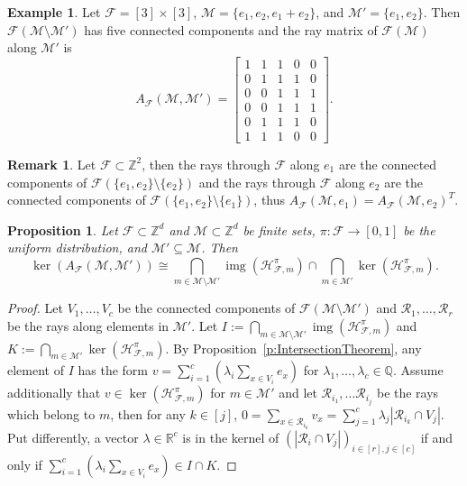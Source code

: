 \documentclass[11pt]{amsart}
\newtheorem{prop}[thm]{Proposition}
\theoremstyle{definition}
\newtheorem{example}[thm]{Example}
\newtheorem{remark}[thm]{Remark}
\numberwithin{equation}{section}
\newcommand{\ring}[1]{\ensuremath{\mathbb{#1}}}
\renewcommand{\>}{\rangle}
\newcommand{\<}{\langle}
\newcommand{\0}{\mathbf{0}}
\newcommand{\1}{\mathbf{1}}
\newcommand{\2}{\mathbf{2}}
\newcommand\QQ{\ring{Q}}
\newcommand\RR{\ring{R}}
\newcommand\ZZ{\ring{Z}}
\newcommand\cF{{\mathcal F}}
\newcommand\cM{{\mathcal M}}
\newcommand\cR{{\mathcal R}}
\DeclareMathOperator\img{img} %
\newcommand{\rayMat}[3]{A_{#1}(#2,#3)}
\newcommand{\heatbathmove}[3]{\mathcal{H}^{#1}_{#2,#3}}
\begin{document}
\begin{example}
Let $\cF =[3]\times [3]$, $\cM=\{e_1, e_2, e_1+e_2 \}$, and $\cM'= \{
e_1, e_2\}$. Then $\cF(\cM\setminus \cM')$ has five connected
components and the ray matrix of $\cF(\cM)$ along
$\cM'$ is 
\[ \rayMat{\cF}{\cM}{\cM'}=
\begin{bmatrix}
1 & 1 & 1 & 0 & 0 \\ 
0 & 1 & 1 & 1 & 0 \\ 
0 & 0 & 1 & 1 & 1 \\
0 & 0 & 1 & 1 & 1\\
0 & 1 & 1 & 1 & 0\\
1 & 1 & 1 & 0 & 0
\end{bmatrix}.
\]
\end{example}

\begin{remark}\label{r:RayMatUnitVecTranspose}
Let $\cF\subset\ZZ^2$, then the rays through $\cF$ along $e_1$ are the
connected components of $\cF(\{e_1,e_2\}\setminus\{e_2\})$ and the rays through $\cF$
along $e_2$ are the connected components of
$\cF(\{e_1,e_2\}\setminus\{e_1\})$, thus
$\rayMat{\cF}{\cM}{e_1}=\rayMat{\cF}{\cM}{e_2}^T$.
\end{remark}

\begin{prop}\label{p:RaysAndCC}
Let $\cF\subset\ZZ^d$ and $\cM\subset\ZZ^d$ be finite sets,
$\pi:\cF\to[0,1]$ be the uniform distribution, and $\cM'\subseteq\cM$.
Then
\begin{equation*}
\ker(\rayMat{\cF}{\cM}{\cM'})\cong
\bigcap_{m\in\cM\setminus\cM'}\img(\heatbathmove{\pi}{\cF}{m})
\cap\bigcap_{m\in\cM'}\ker(\heatbathmove{\pi}{\cF}{m}).
\end{equation*}
\end{prop}
\begin{proof}
Let $V_1,\dots,V_c$ be the connected components of $\cF(\cM\setminus\cM')$ and
$\cR_1,\dots,\cR_r$ be the rays along elements in $\cM'$. 
Let $I:=\bigcap_{m\in\cM\setminus\cM'}\img(\heatbathmove{\pi}{\cF}{m})$ and
$K:=\bigcap_{m\in\cM'}\ker(\heatbathmove{\pi}{\cF}{m})$. By
Proposition~\ref{p:IntersectionTheorem}, any element of $I$ has the
form $v=\sum_{i=1}^c(\lambda_i\sum_{x\in V_i}e_x)$ for
$\lambda_1,\dots,\lambda_c\in\QQ$. Assume additionally that
$v\in\ker(\heatbathmove{\pi}{\cF}{m})$ for $m\in\cM'$ and let
$\cR_{i_1},\dots\cR_{i_j}$ be the rays which belong to $m$,
then for any $k\in[j]$,
$0=\sum_{x\in\cR_{i_k}}v_x=\sum_{j=1}^c\lambda_j|\cR_{i_k}\cap V_j|$. Put 
differently, a vector $\lambda\in\RR^c$ is in the kernel
of $(|\cR_i\cap V_j|)_{i\in[r],j\in[c]}$ if and only if
$\sum_{i=1}^c(\lambda_i\sum_{x\in V_i}e_x)\in I\cap K$.  
\end{proof}
\end{document}
